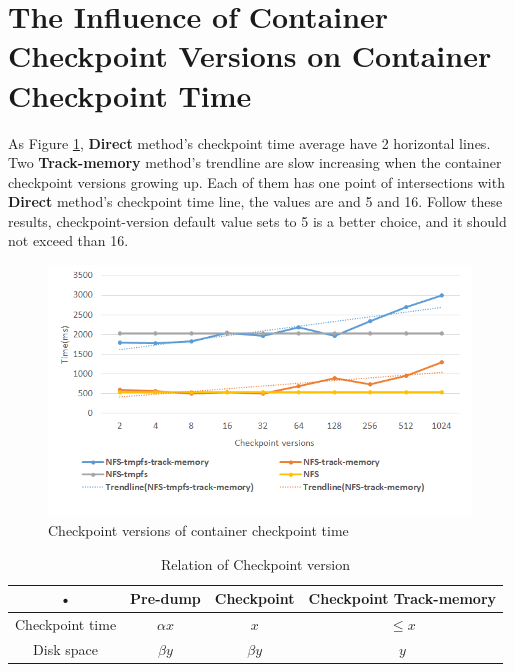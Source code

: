 \section{The Influence of Container Checkpoint Versions on Container Checkpoint Time}
As Figure \ref{fig:versions}, \textbf{Direct} method's checkpoint time average have 2 horizontal lines.
Two \textbf{Track-memory} method's trendline are slow increasing when the container checkpoint versions growing up.
Each of them has one point of intersections with \textbf{Direct} method's checkpoint time line, the values are and 5 and 16.
Follow these results, checkpoint-version default value sets to 5 is a better choice, and it should not exceed than 16.

\begin{figure}[htbp]
\begin{center}
\includegraphics[width=14cm]{figure/versions.png}
\end{center}
\caption{Checkpoint versions of container checkpoint time}
\label{fig:versions}
\end{figure}

\begin{table}[hbtp]
\begin{center}
\begin{tabular}{|c|c|c|c|}
\hline
• & Pre-dump & Checkpoint & Checkpoint \textbf{Track-memory}\\
\hline
Checkpoint time & $ \alpha x $ & $ x $ & $ \leq x $ \\
\hline
Disk space & $ \beta y $ & $ \beta y $ & $ y $\\
\hline
\end{tabular}
\caption{Relation of Checkpoint version}
\label{table:versions}
\end{center}
\end{table}
